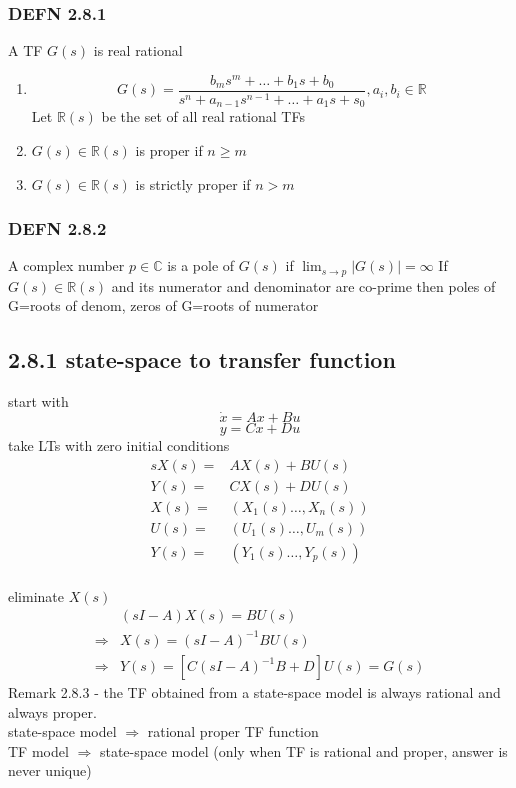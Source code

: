 \documentclass[letterpaper]{article}
\begin{document}
\subsubsection*{DEFN 2.8.1} A TF $G(s)$ is real rational
\begin{enumerate}
	\item $$G(s)=\frac{b_ms^m+\hdots+b_1s+b_0}{s^n+a_{n-1}s^{n-1}+\hdots+a_1s+s_0},a_i,b_i\in \mathbb{R}$$
	      Let $\mathbb{R}(s)$ be the set of all real rational TFs
	\item $G(s)\in \mathbb{R}(s)$ is proper if $n\geq m$
	\item $G(s) \in \mathbb{R}(s)$ is strictly proper if $n > m$
\end{enumerate}
\subsubsection*{DEFN 2.8.2}
A complex number $p\in \mathbb{C}$ is a pole of $G(s)$ if $\lim_{s\rightarrow p}|G(s)|=\infty$
If $G(s)\in \mathbb{R}(s)$ and its numerator and denominator are co-prime then poles of G=roots of denom, zeros of G=roots of numerator		    
		    
\subsection*{2.8.1 state-space to transfer function}
start with $$\dot x=Ax+Bu$$$$y=Cx+Du$$
take LTs with zero initial conditions
\begin{align*}
	sX(s)= & AX(s)+BU(s)           \\
	Y(s)=  & CX(s)+DU(s)           \\
	X(s)=  & (X_1(s)\hdots,X_n(s)) \\
	U(s)=  & (U_1(s)\hdots,U_m(s)) \\
	Y(s)=  & (Y_1(s)\hdots,Y_p(s)) \\
\end{align*}	    

eliminate $X(s)$
\begin{align*}
	            & (sI-A)X(s)=BU(s)                \\
	\Rightarrow & X(s)=(sI-A)^{-1}BU(s)           \\
	\Rightarrow & Y(s)=[C(sI-A)^{-1}B+D]U(s)=G(s) 
\end{align*}
Remark 2.8.3 - the TF obtained from a state-space model is always rational and always proper.\\
state-space model $\Rightarrow$ rational proper TF function\\
TF model $\Rightarrow$ state-space model (only when TF is rational and proper, answer is never unique)
\end{document}
